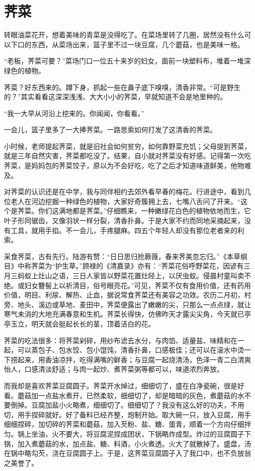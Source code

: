 \section{荠菜}
转眼油菜花开，想着美味的青菜是没得吃了。在菜场里转了几圈，居然没有什么可以下口的东西，从菜场出来，篮子里不过一块豆腐，几个蘑菇，也是美味一格。

“老板，荠菜可要？”菜场门口一位五十来岁的妇女，面前一块塑料布，堆着一堆深绿色的植物。

荠菜？好东西来的。蹲下身，抓起一些在鼻子底下嗅嗅，清香非常。“可是野生的？”其实看看这深深浅浅、大大小小的荠菜，早就知道不会是地里种的。

“我一大早从河沿上挖来的。你闻闻，你看看。”

一会儿，篮子里多了一大捧荠菜。一路思索如何打发了这清香的荠菜。

\pskip
小时候，老师提起荠菜，就是旧社会如何贫穷，如何靠野菜充饥；父母提到荠菜，就是三年自然灾害，荠菜都吃没了。结果，自小就对荠菜没有好感。记得第一次吃荠菜，是妈妈包的荠菜饺子，原以为不会好吃，吃了之后才知道味道鲜美，他物难及。

对荠菜的认识还是在中学，我与同伴相约去郊外看早春的梅花。行进途中，看到几位老人在河边挖掘一种绿色的植物，大家好奇簇拥上去，七嘴八舌问了开来。“这个是荠菜。你们这满地都是荠菜。”仔细瞧来，一种嫩绿花白色的植物依地而生，它叶子形同锯齿，又像羽状一样分裂，清香扑鼻。于是大家不约而同地采摘起来，没有工具，就用手掐。不一会儿，手疼腿麻。四五个年轻人却没有那位老者来的利索。

\pskip
采食荠菜，古有先行。陆游有赞：“日日思归抢蕨薇，春来荠美忽忘归。”《本草纲目》中称荠菜为“护生草。”顾禄的《清嘉录》亦有：“荠菜花俗呼野菜花，因谚有三月三蚂蚁上灶山之语，三日人家皆以野菜花置灶陉上，以厌虫蚁。侵晨村童叫卖不绝。或妇女簪髻上以祈清目，俗号眼亮花。”可见，荠菜不仅有食用价值，还有药用价值，明目、利尿、解热、止血，据说常食荠菜还有美容之功效。农历二月初，村旁、地头、溪边或草地、麦田中，荠菜便露出了嫩嫩的尖，只那么一点点绿，就让寒气未消的大地充满春意和生机。荠菜长得快，仿佛昨天才露尖尖角，今天就已亭亭玉立，明天就会挺起长长的茎，顶着洁白的花。

\pskip
荠菜的吃法很多：将荠菜剁碎，用纱布滤去水分，与肉馅、适量盐、味精和在一起，可以蒸包子、包水饺、包小馄饨，清香扑鼻，口感极佳；还可以在滚水中烫一下捞起来，用香油凉拌，吃得满嘴的鲜香；与豆腐一起烧清汤，色泽一青二白清爽怡人，口感清淡舒适；与肉一起炒、煮荠菜粥等都可以，味道浓烈奔放。

而我却是喜欢荠菜豆腐圆子。荠菜开水焯过，细细切了，盛在白净瓷碗，很是好看。蘑菇加一点盐水煮开，已然柔软，细细切了，却是暗暗的灰色，煮蘑菇的水不要倒掉。豆腐加盐小火略煮，细细切了。细细切了？我没有这么好的功夫，不用切，用手捏碎就好。好了备料已经齐整，炮制开始。取大碗一只，放入豆腐，用手细细捏碎，加切碎的荠菜和蘑菇，加入芡粉、盐、糖、蛋青，顺着一个方向仔细拌匀。锅上坐油，火不要大，将豆腐泥捏成团状，下锅略炸成型。炸过的豆腐圆子下锅，加入煮蘑菇的水，加点盐、糖、料酒，小火煮透。火大了就散掉了。盛盘，汤在锅中略勾芡，浇在豆腐圆子上。于是，这荠菜豆腐圆子入了我口中，也不负放翁之美誉了。


